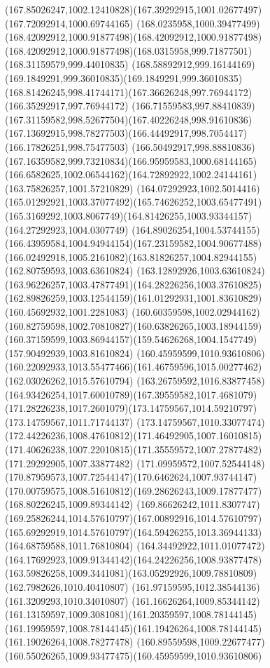 {{\curveto(167.85026247,1002.12410828)(167.39292915,1001.02677497)(167.72092914,1000.69744165)
\curveto(168.0235958,1000.39477499)(168.42092912,1000.91877498)(168.42092912,1000.91877498)
\curveto(168.42092912,1000.91877498)(168.0315958,999.71877501)(168.31159579,999.44010835)
\curveto(168.58892912,999.16144169)(169.1849291,999.36010835)(169.1849291,999.36010835)
\curveto(168.81426245,998.41744171)(167.36626248,997.76944172)(166.35292917,997.76944172)
\curveto(166.71559583,997.88410839)(167.31159582,998.52677504)(167.40226248,998.91610836)
\curveto(167.13692915,998.78277503)(166.44492917,998.7054417)(166.17826251,998.75477503)
\curveto(166.50492917,998.88810836)(167.16359582,999.73210834)(166.95959583,1000.68144165)
\curveto(166.6582625,1002.06544162)(164.72892922,1002.24144161)(163.75826257,1001.57210829)
\curveto(164.07292923,1002.5014416)(165.01292921,1003.37077492)(165.74626252,1003.65477491)
\curveto(165.3169292,1003.8067749)(164.81426255,1003.93344157)(164.27292923,1004.0307749)
\curveto(164.89026254,1004.53744155)(166.43959584,1004.94944154)(167.23159582,1004.90677488)
\curveto(166.02492918,1005.2161082)(163.81826257,1004.82944155)(162.80759593,1003.63610824)
\curveto(163.12892926,1003.63610824)(163.96226257,1003.47877491)(164.28226256,1003.37610825)
\curveto(162.89826259,1003.12544159)(161.01292931,1001.83610829)(160.45692932,1001.2281083)
\curveto(160.60359598,1002.02944162)(160.82759598,1002.70810827)(160.63826265,1003.18944159)
\curveto(160.37159599,1003.86944157)(159.54626268,1004.1547749)(157.90492939,1003.81610824)
\moveto(160.45959599,1010.93610806)
\curveto(160.22092933,1013.55477466)(161.46759596,1015.00277462)(162.03026262,1015.57610794)
\curveto(163.26759592,1016.83877458)(164.93426254,1017.60010789)(167.39559582,1017.4681079)
\curveto(171.28226238,1017.2601079)(173.14759567,1014.59210797)(173.14759567,1011.71744137)
\curveto(173.14759567,1010.33077474)(172.44226236,1008.47610812)(171.46492905,1007.16010815)
\curveto(171.40626238,1007.22010815)(171.35559572,1007.27877482)(171.29292905,1007.33877482)
\curveto(171.09959572,1007.52544148)(170.87959573,1007.72544147)(170.6462624,1007.93744147)
\curveto(170.00759575,1008.51610812)(169.28626243,1009.17877477)(168.80226245,1009.89344142)
\curveto(169.86626242,1011.8307747)(169.25826244,1014.57610797)(167.00892916,1014.57610797)
\curveto(165.69292919,1014.57610797)(164.59426255,1013.36944133)(164.68759588,1011.76810804)
\curveto(164.34492922,1011.01077472)(164.17692923,1009.91344142)(164.24226256,1008.93877478)
\curveto(163.59826258,1009.3441081)(163.05292926,1009.78810809)(162.7982626,1010.40410807)
\lineto(161.97159595,1012.38544136)
\lineto(161.3209293,1010.34010807)
\curveto(161.16626264,1009.85344142)(161.13159597,1009.3081081)(161.20359597,1008.78144145)
\curveto(161.19959597,1008.78144145)(161.19426264,1008.78144145)(161.19026264,1008.78277478)
\curveto(160.89559598,1009.22677477)(160.55026265,1009.93477475)(160.45959599,1010.93610806)
}
}
